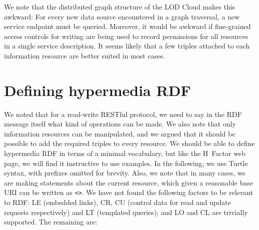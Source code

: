 \documentclass{llncs}
\begin{document}
We note that the distributed graph structure of the LOD Cloud makes
this awkward: For every new data source encountered in a graph
traversal, a new service endpoint must be queried. Moreover, it would
be awkward if fine-grained access controls for writing are being used
to record permissions for all resources in a single service
description. It seems likely that a few triples attached to each
information resource are better suited in most cases.

\section{Defining hypermedia RDF}

We noted that for a read-write RESTful protocol, we need to say in the
RDF message itself what kind of operations can be made. We also note
that only information resources can be manipulated, and we argued that
it should be possible to add the required triples to every
resource. We should be able to define hypermedia RDF in terms of a
minimal vocabulary, but like the H~Factor web page, we will find it
instructive to use examples. In the following, we use Turtle syntax,
with prefixes omitted for brevity. Also, we note that in many cases,
we are making statements about the current resource, which given a
reasonable base URI can be written as \texttt{<>}. We have not found
the following factors to be relevant to RDF: \textsf{LE} (embedded
links), \textsf{CR}, \textsf{CU} (control data for read and update
requests respectively) and \textsf{LT} (templated queries); and
\textsf{LO} and \textsf{CL} are trivially supported. The remaining
are:
\end{document}
